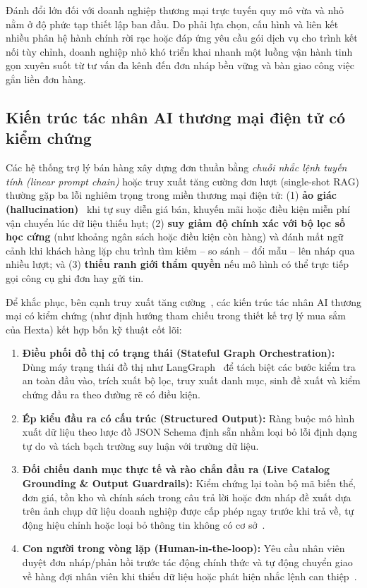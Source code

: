 Đánh đổi lớn đối với doanh nghiệp thương mại trực tuyến quy mô vừa và nhỏ nằm ở độ phức tạp thiết lập ban đầu. Do phải lựa chọn, cấu hình và liên kết nhiều phân hệ hành chính rời rạc hoặc đáp ứng
yêu cầu gói dịch vụ cho trình kết nối tùy chỉnh, doanh nghiệp nhỏ khó triển khai nhanh một luồng vận hành tinh gọn xuyên suốt từ tư vấn đa kênh đến đơn nháp bền vững và bàn giao công việc gắn
liền đơn hàng.

\subsection{Kiến trúc tác nhân AI thương mại điện tử có kiểm chứng}
Các hệ thống trợ lý bán hàng xây dựng đơn thuần bằng \emph{chuỗi nhắc lệnh tuyến tính (linear prompt chain)} hoặc truy xuất tăng cường đơn lượt (single-shot RAG) thường gặp ba lỗi nghiêm trọng
trong miền thương mại điện tử: (1) \textbf{ảo giác (hallucination)}~\cite{ji2023hallucination} khi tự suy diễn giá bán, khuyến mãi hoặc điều kiện miễn phí vận chuyển lúc dữ liệu thiếu hụt; (2) \textbf{suy giảm độ chính xác
với bộ lọc số học cứng} (như khoảng ngân sách hoặc điều kiện còn hàng) và đánh mất ngữ cảnh khi khách hàng lặp chu trình tìm kiếm -- so sánh -- đổi mẫu -- lên nháp qua nhiều lượt; và (3)
\textbf{thiếu ranh giới thẩm quyền} nếu mô hình có thể trực tiếp gọi công cụ ghi đơn hay gửi tin.

Để khắc phục, bên cạnh truy xuất tăng cường~\cite{lewis2020rag}, các kiến trúc tác nhân AI thương mại có kiểm chứng (như định hướng tham chiếu trong thiết kế trợ lý mua sắm của Hexta) kết hợp bốn kỹ thuật cốt lõi:
\begin{enumerate}
  \item \textbf{Điều phối đồ thị có trạng thái (Stateful Graph Orchestration):} Dùng máy trạng thái đồ thị như LangGraph~\cite{langgraph} để tách biệt các bước kiểm tra an toàn đầu vào, trích xuất bộ lọc, truy
    xuất danh mục, sinh đề xuất và kiểm chứng đầu ra theo đường rẽ có điều kiện.
  \item \textbf{Ép kiểu đầu ra có cấu trúc (Structured Output):} Ràng buộc mô hình xuất dữ liệu theo lược đồ JSON Schema định sẵn nhằm loại bỏ lỗi định dạng tự do và tách bạch trường suy luận với
    trường dữ liệu.
  \item \textbf{Đối chiếu danh mục thực tế và rào chắn đầu ra (Live Catalog Grounding \& Output Guardrails):} Kiểm chứng lại toàn bộ mã biến thể, đơn giá, tồn kho và chính sách trong câu trả lời
    hoặc đơn nháp đề xuất dựa trên ảnh chụp dữ liệu doanh nghiệp được cấp phép ngay trước khi trả về, tự động hiệu chỉnh hoặc loại bỏ thông tin không có cơ sở~\cite{rebedea2023nemo}.
  \item \textbf{Con người trong vòng lặp (Human-\hspace{0pt}in-\hspace{0pt}the-\hspace{0pt}loop):} Yêu cầu nhân viên duyệt đơn nháp/\hspace{0pt}phản hồi trước tác động chính thức và tự động chuyển giao về hàng đợi nhân viên khi thiếu dữ liệu
    hoặc phát hiện nhắc lệnh can thiệp~\cite{amershi2019guidelines}.
\end{enumerate}

